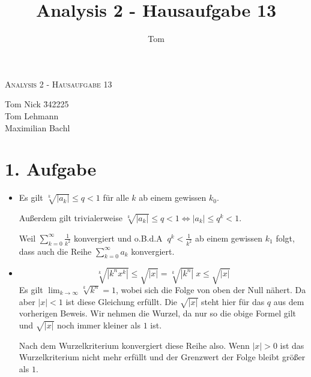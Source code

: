 \documentclass[10pt,a4paper,parskip=half]{scrartcl}
\author{Tom}
\title{Analysis 2 - Hausaufgabe 13}
\begin{document}
\begin{center}
\textsc{\Large{Analysis 2 - Hausaufgabe 13}} \\
\end{center}
\begin{tabbing}
Tom Nick \hspace{1.4cm}\= 342225\\
Tom Lehmann\\
Maximilian Bachl
\end{tabbing}
\section*{1. Aufgabe}
\begin{itemize}
\item
Es gilt $\sqrt[k]{\left|a_k\right|} \le q < 1$ für alle $k$ ab einem gewissen $k_0$. 

Außerdem gilt trivialerweise $\sqrt[k]{\left|a_k\right|} \le q <1 \Leftrightarrow \left|a_k\right| \le q^k <1$. 

Weil $\sum_{k=0}^{\infty} \frac 1 {k^2}$ konvergiert und o.B.d.A $~q^k < \frac 1 {k^2}$ ab einem gewissen $k_1$ folgt, dass auch die Reihe $\sum_{k=0}^{\infty} a_k$ konvergiert.
\item
$$\sqrt[k]{|k^nx^k|} \le \sqrt {|x|} = \sqrt[k]{|k^n|}~x \le \sqrt {|x|}$$
Es gilt $\lim_{k\to\infty} \sqrt[k]{k^n} = 1$, wobei sich die Folge von oben der Null nähert. Da aber $|x| < 1$ ist diese Gleichung erfüllt. Die $ \sqrt {|x|}$ steht hier für das $q$ aus dem vorherigen Beweis. Wir nehmen die Wurzel, da nur so die obige Formel gilt und $\sqrt {|x|}$ noch immer kleiner als $1$ ist. 

Nach dem Wurzelkriterium konvergiert diese Reihe also. Wenn $\left| x \right| > 0$ ist das Wurzelkriterium nicht mehr erfüllt und der Grenzwert der Folge bleibt größer als $1$. 
\end{itemize}
\end{document}
